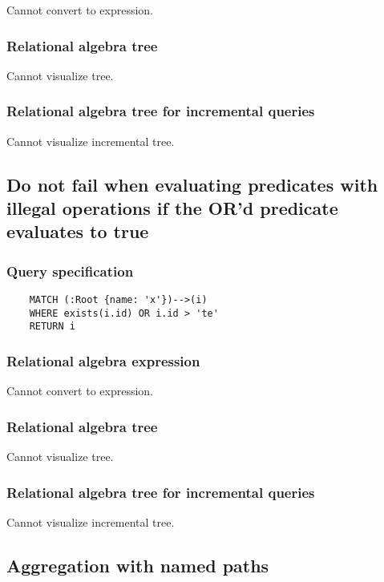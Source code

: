 	Cannot convert to expression.

	\subsubsection*{Relational algebra tree}

	Cannot visualize tree.

	\subsubsection*{Relational algebra tree for incremental queries}

	Cannot visualize incremental tree.
	\subsection{Do not fail when evaluating predicates with illegal operations if the OR'd predicate evaluates to true}

	\subsubsection*{Query specification}

	\begin{lstlisting}
	MATCH (:Root {name: 'x'})-->(i)
	WHERE exists(i.id) OR i.id > 'te'
	RETURN i
	\end{lstlisting}


	\subsubsection*{Relational algebra expression}

	Cannot convert to expression.

	\subsubsection*{Relational algebra tree}

	Cannot visualize tree.

	\subsubsection*{Relational algebra tree for incremental queries}

	Cannot visualize incremental tree.
	\subsection{Aggregation with named paths}

